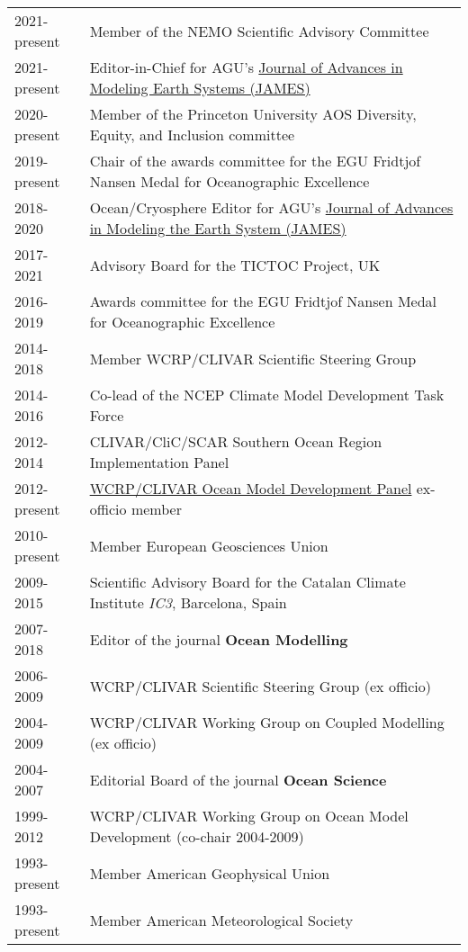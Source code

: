 \documentclass{article}
\begin{document}
\begin{tabular}{ll}

2021-present & Member of the NEMO Scientific Advisory Committee
\\
2021-present & Editor-in-Chief for  AGU's  \href{http://agupubs.onlinelibrary.wiley.com/hub/journal/10.1002/(ISSN)1942-2466/editorial-board/editorial-board.html}{Journal of Advances in Modeling Earth Systems (JAMES)} 
 \\
 2020-present & Member of the Princeton University AOS Diversity, Equity, and Inclusion committee
 \\
2019-present & Chair of the awards committee for the EGU Fridtjof Nansen Medal for Oceanographic Excellence 
\\
2018-2020 & Ocean/Cryosphere Editor for AGU's  \href{http://agupubs.onlinelibrary.wiley.com/hub/journal/10.1002/(ISSN)1942-2466/editorial-board/editorial-board.html}{Journal of Advances in Modeling the Earth System (JAMES)} 
\\
2017-2021 & Advisory Board for the TICTOC Project, UK
\\
  2016-2019 & Awards committee for the EGU Fridtjof Nansen Medal for Oceanographic Excellence 
  \\
2014-2018 &  Member  WCRP/CLIVAR Scientific Steering Group \\
2014-2016     & Co-lead of the NCEP Climate Model Development Task Force\\
2012-2014     & CLIVAR/CliC/SCAR Southern Ocean Region Implementation Panel \\
2012-present &  \href{http://www.clivar.org/clivar-panels/omdp}{WCRP/CLIVAR Ocean Model Development Panel} ex-officio member
\\
2010-present & Member European Geosciences Union \\
2009-2015     &  Scientific Advisory Board for the Catalan  Climate Institute {\it IC3}, Barcelona, Spain \\
2007-2018 & Editor of the journal {\bf Ocean Modelling} \\
2006-2009     &  WCRP/CLIVAR Scientific Steering Group (ex officio) \\
2004-2009     &  WCRP/CLIVAR Working Group on Coupled Modelling (ex officio) \\
2004-2007     & Editorial Board of the journal {\bf Ocean Science} \\
1999-2012     & WCRP/CLIVAR Working Group on Ocean Model Development  (co-chair 2004-2009) \\
1993-present  & Member American Geophysical Union \\
1993-present  & Member American Meteorological Society \\
\end{tabular}
\end{document}
